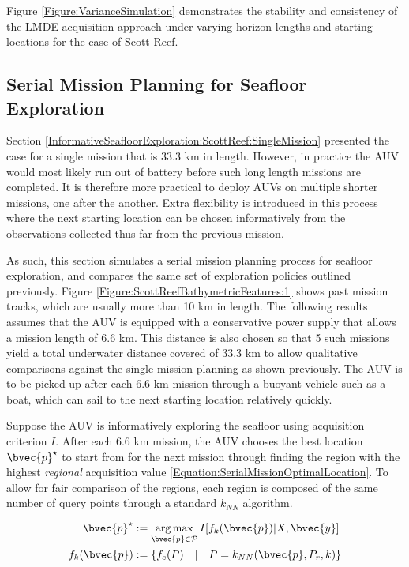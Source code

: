 			Figure \ref{Figure:VarianceSimulation} demonstrates the stability and consistency of the LMDE acquisition approach under varying horizon lengths and starting locations for the case of Scott Reef. 
				
		\subsection{Serial Mission Planning for Seafloor Exploration}
		\label{InformativeSeafloorExploration:ScottReef:SerialMission}
			
			Section \ref{InformativeSeafloorExploration:ScottReef:SingleMission} presented the case for a single mission that is 33.3 km in length. However, in practice the AUV would most likely run out of battery before such long length missions are completed. It is therefore more practical to deploy AUVs on multiple shorter missions, one after the another. Extra flexibility is introduced in this process where the next starting location can be chosen informatively from the observations collected thus far from the previous mission.
			
			As such, this section simulates a serial mission planning process for seafloor exploration, and compares the same set of exploration policies outlined previously. Figure \ref{Figure:ScottReefBathymetricFeatures:1} shows past mission tracks, which are usually more than 10 km in length. The following results assumes that the AUV is equipped with a conservative power supply that allows a mission length of 6.6 km. This distance is also chosen so that 5 such missions yield a total underwater distance covered of 33.3 km to allow qualitative comparisons against the single mission planning as shown previously. The AUV is to be picked up after each 6.6 km mission through a buoyant vehicle such as a boat, which can sail to the next starting location relatively quickly.
			
			Suppose the AUV is informatively exploring the seafloor using acquisition criterion $I$. After each 6.6 km mission, the AUV chooses the best location $\bvec{p}^{\star}$ to start from for the next mission through finding the region with the highest \textit{regional} acquisition value \eqref{Equation:SerialMissionOptimalLocation}. To allow for fair comparison of the regions, each region is composed of the same number of query points through a standard $k_{NN}$ algorithm.
			
			\begin{equation}
				\begin{aligned}
					\bvec{p}^{\star} &:= \argmax_{\bvec{p} \in \mathcal{P}} I[f_{k}(\bvec{p}) | X, \bvec{y}] \\
					f_{k}(\bvec{p}) &:= \{f_{e}(P) \quad | \quad P = k_{NN}(\bvec{p}, P_{r}, k) \}
				\end{aligned}
			\label{Equation:SerialMissionOptimalLocation}
			\end{equation}
			
